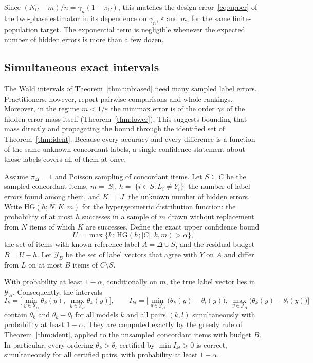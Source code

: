 \documentclass[twoside,11pt]{article}
\newcommand{\1}{\mathbf{1}}
\newcommand{\Dset}{\Delta}
\newcommand{\Cset}{C}
\begin{document}
Since $(N_\Cset-m)/n=\gamma_n(1-\pi_\Cset)$, this matches the design error~\eqref{eq:upper} of the two-phase estimator in its dependence on $\gamma_n$, $\varepsilon$ and $m$, for the same finite-population target. The exponential term is negligible whenever the expected number of hidden errors is more than a few dozen.

\subsection{Simultaneous exact intervals}
\label{sec:simultaneous}

The Wald intervals of Theorem~\ref{thm:unbiased} need many sampled label errors. Practitioners, however, report pairwise comparisons and whole rankings. Moreover, in the regime $m<1/\varepsilon$ the minimax error is of the order $\gamma\varepsilon$ of the hidden-error mass itself (Theorem~\ref{thm:lower}). This suggests bounding that mass directly and propagating the bound through the identified set of Theorem~\ref{thm:ident}. Because every accuracy and every difference is a function of the same unknown concordant labels, a single confidence statement about those labels covers all of them at once.

Assume $\pi_\Dset=1$ and Poisson sampling of concordant items. Let $S\subseteq\Cset$ be the sampled concordant items, $m=|S|$, $h=|\{i\in S:L_i\ne Y_i\}|$ the number of label errors found among them, and $K=|J|$ the unknown number of hidden errors. Write $\mathrm{HG}(h;N,K,m)$ for the hypergeometric distribution function: the probability of at most $h$ successes in a sample of $m$ drawn without replacement from $N$ items of which $K$ are successes. Define the exact upper confidence bound
\[
U=\max\{k:\ \mathrm{HG}(h;|\Cset|,k,m)>\alpha\},
\]
the set of items with known reference label $A=\Dset\cup S$, and the residual budget $B=U-h$. Let $\mathcal Y_B$ be the set of label vectors that agree with $Y$ on $A$ and differ from $L$ on at most $B$ items of $\Cset\setminus S$.

\begin{theorem}\label{thm:simultaneous}
With probability at least $1-\alpha$, conditionally on $m$, the true label vector lies in $\mathcal Y_B$. Consequently, the intervals
\[
I_k=\Big[\min_{y\in\mathcal Y_B}\theta_k(y),\ \max_{y\in\mathcal Y_B}\theta_k(y)\Big],\qquad
I_{kl}=\Big[\min_{y\in\mathcal Y_B}\big(\theta_k(y)-\theta_l(y)\big),\ \max_{y\in\mathcal Y_B}\big(\theta_k(y)-\theta_l(y)\big)\Big]
\]
contain $\theta_k$ and $\theta_k-\theta_l$ for all models $k$ and all pairs $(k,l)$ simultaneously with probability at least $1-\alpha$. They are computed exactly by the greedy rule of Theorem~\ref{thm:ident}, applied to the unsampled concordant items with budget $B$. In particular, every ordering $\theta_k>\theta_l$ certified by $\min I_{kl}>0$ is correct, simultaneously for all certified pairs, with probability at least $1-\alpha$.
\end{theorem}
\end{document}

